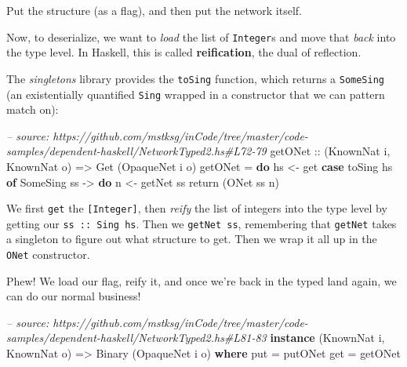 \documentclass[]{article}
\newenvironment{Shaded}{}{}
\newcommand{\KeywordTok}[1]{\textcolor[rgb]{0.00,0.44,0.13}{\textbf{{#1}}}}
\newcommand{\DataTypeTok}[1]{\textcolor[rgb]{0.56,0.13,0.00}{{#1}}}
\newcommand{\CommentTok}[1]{\textcolor[rgb]{0.38,0.63,0.69}{\textit{{#1}}}}
\newcommand{\OtherTok}[1]{\textcolor[rgb]{0.00,0.44,0.13}{{#1}}}
\newcommand{\FunctionTok}[1]{\textcolor[rgb]{0.02,0.16,0.49}{{#1}}}
\newcommand{\NormalTok}[1]{{#1}}
\begin{document}
Put the structure (as a flag), and then put the network itself.

Now, to deserialize, we want to \emph{load} the list of \texttt{Integer}s and
move that \emph{back} into the type level. In Haskell, this is called
\textbf{reification}, the dual of reflection.

The \emph{singletons} library provides the \texttt{toSing} function, which
returns a \texttt{SomeSing} (an existentially quantified \texttt{Sing} wrapped
in a constructor that we can pattern match on):

\begin{Shaded}
\begin{Highlighting}[]
\CommentTok{-- source: https://github.com/mstksg/inCode/tree/master/code-samples/dependent-haskell/NetworkTyped2.hs#L72-79}
\OtherTok{getONet ::} \NormalTok{(}\DataTypeTok{KnownNat} \NormalTok{i, }\DataTypeTok{KnownNat} \NormalTok{o)}
        \OtherTok{=>} \DataTypeTok{Get} \NormalTok{(}\DataTypeTok{OpaqueNet} \NormalTok{i o)}
\NormalTok{getONet }\FunctionTok{=} \KeywordTok{do}
    \NormalTok{hs }\OtherTok{<-} \NormalTok{get}
    \KeywordTok{case} \NormalTok{toSing hs }\KeywordTok{of}
      \DataTypeTok{SomeSing} \NormalTok{ss }\OtherTok{->} \KeywordTok{do}
        \NormalTok{n }\OtherTok{<-} \NormalTok{getNet ss}
        \NormalTok{return (}\DataTypeTok{ONet} \NormalTok{ss n)}
\end{Highlighting}
\end{Shaded}

We first \texttt{get} the \texttt{{[}Integer{]}}, then \emph{reify} the list of
integers into the type level by getting our \texttt{ss\ ::\ Sing\ hs}. Then we
\texttt{getNet\ ss}, remembering that \texttt{getNet} takes a singleton to
figure out what structure to get. Then we wrap it all up in the \texttt{ONet}
constructor.

Phew! We load our flag, reify it, and once we're back in the typed land again,
we can do our normal business!

\begin{Shaded}
\begin{Highlighting}[]
\CommentTok{-- source: https://github.com/mstksg/inCode/tree/master/code-samples/dependent-haskell/NetworkTyped2.hs#L81-83}
\KeywordTok{instance} \NormalTok{(}\DataTypeTok{KnownNat} \NormalTok{i, }\DataTypeTok{KnownNat} \NormalTok{o) }\OtherTok{=>} \DataTypeTok{Binary} \NormalTok{(}\DataTypeTok{OpaqueNet} \NormalTok{i o) }\KeywordTok{where}
    \NormalTok{put }\FunctionTok{=} \NormalTok{putONet}
    \NormalTok{get }\FunctionTok{=} \NormalTok{getONet}
\end{Highlighting}
\end{Shaded}
\end{document}

